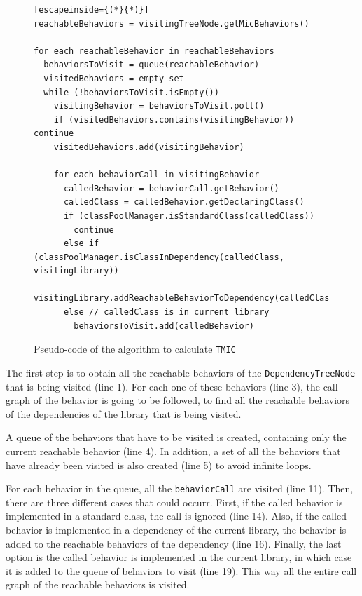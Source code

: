 \begin{figure}[ht!]
\begin{lstlisting}[escapeinside={(*}{*)}]
reachableBehaviors = visitingTreeNode.getMicBehaviors()

for each reachableBehavior in reachableBehaviors
  behaviorsToVisit = queue(reachableBehavior)
  visitedBehaviors = empty set
  while (!behaviorsToVisit.isEmpty())
    visitingBehavior = behaviorsToVisit.poll()
    if (visitedBehaviors.contains(visitingBehavior)) continue
    visitedBehaviors.add(visitingBehavior)

    for each behaviorCall in visitingBehavior
      calledBehavior = behaviorCall.getBehavior()
      calledClass = calledBehavior.getDeclaringClass()
      if (classPoolManager.isStandardClass(calledClass))
        continue
      else if (classPoolManager.isClassInDependency(calledClass, visitingLibrary))
        visitingLibrary.addReachableBehaviorToDependency(calledClass)
      else // calledClass is in current library
        behaviorsToVisit.add(calledBehavior)
\end{lstlisting}
\caption{Pseudo-code of the algorithm to calculate \texttt{TMIC}}
\label{fig:calculate-tmic}
\end{figure}

The first step is to obtain all the reachable behaviors of the \texttt{DependencyTreeNode} that is being visited (line 1). For each one of these behaviors (line 3), the call graph of the behavior is going to be followed, to find all the reachable behaviors of the dependencies of the library that is being visited.

A queue of the behaviors that have to be visited is created, containing only the current reachable behavior (line 4). In addition, a set of all the behaviors that have already been visited is also created (line 5) to avoid infinite loops.

For each behavior in the queue, all the \texttt{behaviorCall} are visited (line 11). Then, there are three different cases that could occurr. First, if the called behavior is implemented in a standard class, the call is ignored (line 14). Also, if the called behavior is implemented in a dependency of the current library, the behavior is added to the reachable behaviors of the dependency (line 16). Finally, the last option is the called behavior is implemented in the current library, in which case it is added to the queue of behaviors to visit (line 19). This way all the entire call graph of the reachable behaviors is visited.

